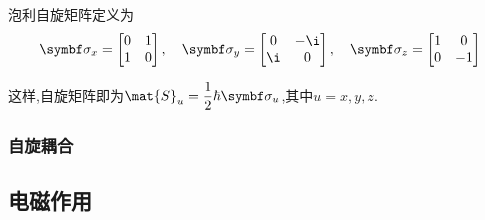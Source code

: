\documentclass{ctexart}
\begin{document}
\begin{definition}[泡利自旋矩阵]
    泡利自旋矩阵定义为
    \[\symbf\sigma_x=\begin{bmatrix}
        0&1\\1&0
    \end{bmatrix},\quad\symbf\sigma_y=\begin{bmatrix}
        0&-\i\\\i&0
    \end{bmatrix},\quad\symbf\sigma_z=\begin{bmatrix}
        1&0\\0&-1
    \end{bmatrix}\]
\end{definition}
这样,自旋矩阵即为$\mat{S}_u=\dfrac{1}{2}\hbar\symbf\sigma_u$,其中$u=x,y,z$.
\subsubsection{自旋耦合}
\subsection{电磁作用}
\end{document}
